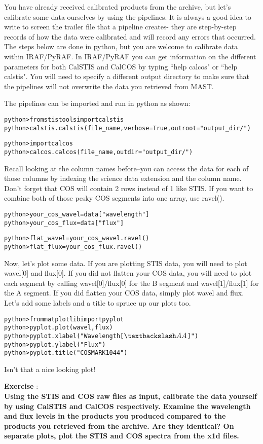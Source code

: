 You have already received calibrated products from the archive, but let's calibrate some data ourselves by using the pipelines.  It is always a good idea to write to screen the trailer file that a pipeline creates- they are step-by-step records of how the data were calibrated and will record any errors that occurred. The steps below are done in python, but you are welcome to calibrate data within IRAF/PyRAF. In IRAF/PyRAF you can get information on the different parameters for both CalSTIS and CalCOS by typing ``help calcos" or ``help calstis". You will need to specify a different output directory to make sure that the pipelines will not overwrite the data you retrieved from MAST.

The pipelines can be imported and run in python as shown:
\begin{alltt}
python> from stistools import calstis
python> calstis.calstis(file_name, verbose=True, outroot="output_dir/")

python> import calcos
python> calcos.calcos(file_name, outdir="output_dir/")
\end{alltt}

Recall looking at the column names before--you can access the data for each of those columns by indexing the science data extension and the column name. Don't forget that COS will contain 2 rows instead of 1 like STIS. If you want to combine both of those pesky COS segments into one array, use ravel(). 
\begin{alltt}
python> your_cos_wavel = data["wavelength"]
python> your_cos_flux = data["flux"]

python> flat_wavel = your_cos_wavel.ravel()
python> flat_flux = your_cos_flux.ravel()
\end{alltt}
Now, let's plot some data. If you are plotting STIS data, you will need to plot wavel[0] and flux[0]. If you did not flatten your COS data, you will need to plot each segment by calling wavel[0]/flux[0] for the B segment and wavel[1]/flux[1] for the A segment. If you did flatten your COS data, simply plot wavel and flux. Let's add some labels and a title to spruce up our plots too.
\begin{alltt}
python> from matplotlib import pyplot
python> pyplot.plot(wavel, flux)
python> pyplot.xlabel("Wavelength [$\textbackslash AA$]")
python> pyplot.ylabel("Flux")
python> pyplot.title("COS MARK1044")
\end{alltt}
Isn't that a nice looking plot!

{\bf \color{blue} Exercise  }:  \\
{\bf Using the STIS and COS raw files as input, calibrate the data yourself by using CalSTIS and CalCOS respectively. Examine the wavelength and flux levels in the products you produced compared to the products you retrieved from the archive. Are they identical? On separate plots, plot the STIS and COS spectra from the x1d files.}

